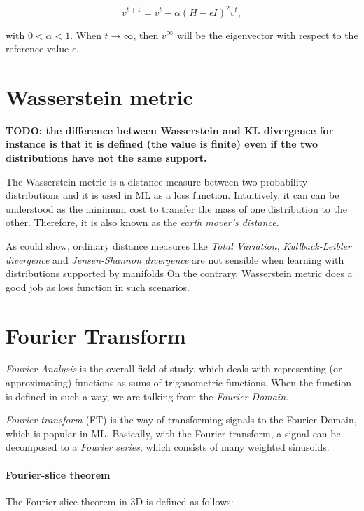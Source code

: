 \begin{equation}
    \label{eq:foldedSpectrumMethod}
    v^{t+1} = v^t - \alpha (H - \epsilon I )^2 v^t ,
\end{equation}

with $0 < \alpha < 1$. When $t \rightarrow \infty$, then $v^{\infty}$ will be the 
eigenvector with respect to the reference value $\epsilon$.


\section{Wasserstein metric}
\label{sec:wasserstein-metric}
\textbf{TODO: the difference between Wasserstein and KL divergence for instance is that it is defined (the value is finite) even if the two distributions have not the same support. }


The Wasserstein metric is a distance measure between two probability distributions and it is used in ML as a loss function\cite{learningWithWasserstein}. 
Intuitively, it can can be understood as the minimum cost to transfer the mass of one distribution to the other.
Therefore, it is also known as the \textit{earth mover's distance}.

As \citet{wassersteinGAN} could show, ordinary distance measures like \textit{Total Variation}, \textit{Kullback-Leibler divergence}
and \textit{Jensen-Shannon divergence} are not sensible when learning with distributions supported by manifolds
On the contrary, Wasserstein metric does a good job as loss function in such scenarios.


\section{Fourier Transform}
\textit{Fourier Analysis} is the overall field of study, which deals with representing (or approximating) functions as 
sums of trigonometric functions. When the function is defined in such a way, we are talking from the \textit{Fourier Domain}.

\textit{Fourier transform} (FT) is the way of transforming signals to the Fourier Domain, which is popular in ML.
Basically, with the Fourier transform, a signal can be decomposed to a \textit{Fourier series}, which consists of many weighted sinusoids. 

\paragraph{Fourier-slice theorem}
The Fourier-slice theorem \cite{fourierSliceTheorem} in 3D is defined as follows:

